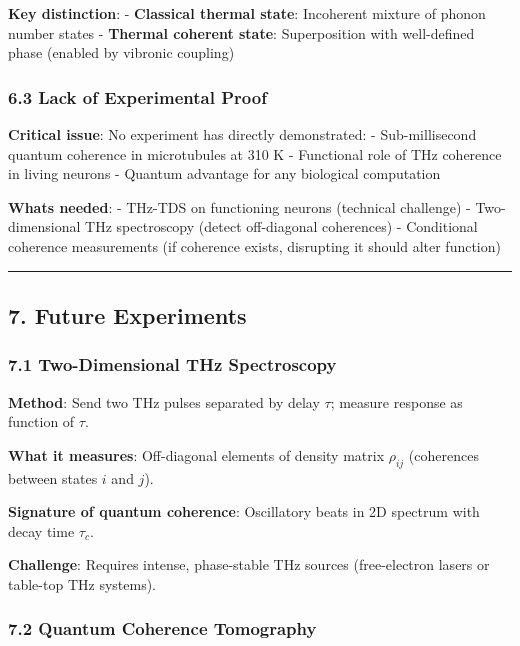 \textbf{Key distinction}: - \textbf{Classical thermal state}: Incoherent
mixture of phonon number states - \textbf{Thermal coherent state}:
Superposition with well-defined phase (enabled by vibronic coupling)

\subsubsection{6.3 Lack of Experimental
Proof}\label{lack-of-experimental-proof}

\textbf{Critical issue}: No experiment has directly demonstrated: -
Sub-millisecond quantum coherence in microtubules at 310 K - Functional
role of THz coherence in living neurons - Quantum advantage for any
biological computation

\textbf{What\textquotesingle s needed}: - THz-TDS on functioning neurons
(technical challenge) - Two-dimensional THz spectroscopy (detect
off-diagonal coherences) - Conditional coherence measurements (if
coherence exists, disrupting it should alter function)

\begin{center}\rule{0.5\linewidth}{0.5pt}\end{center}

\subsection{7. Future Experiments}\label{future-experiments}

\subsubsection{7.1 Two-Dimensional THz
Spectroscopy}\label{two-dimensional-thz-spectroscopy}

\textbf{Method}: Send two THz pulses separated by delay \(\tau\);
measure response as function of \(\tau\).

\textbf{What it measures}: Off-diagonal elements of density matrix
\(\rho_{ij}\) (coherences between states \(i\) and \(j\)).

\textbf{Signature of quantum coherence}: Oscillatory beats in 2D
spectrum with decay time \(\tau_c\).

\textbf{Challenge}: Requires intense, phase-stable THz sources
(free-electron lasers or table-top THz systems).

\subsubsection{7.2 Quantum Coherence
Tomography}\label{quantum-coherence-tomography}


